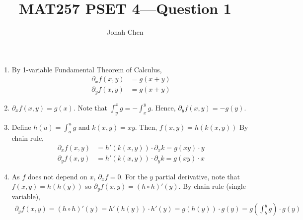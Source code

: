 \documentclass{exam}
\title{MAT257 PSET 4---Question 1}
\author{Jonah Chen}
\numberwithin{equation}{section}
\begin{document}
    \sffamily
    \maketitle
    \begin{enumerate}[label=(\alph*)]
        \item By 1-variable Fundamental Theorem of Calculus,
        \begin{align*}
            \partial_x f(x,y)&=g(x+y)\\
            \partial_y f(x,y)&=g(x+y)
        \end{align*}
        \item $\partial_xf(x,y)=g(x)$. Note that $\int_y^xg=-\int_x^yg$. Hence, $\partial_yf(x,y)=-g(y)$.
        \item Define $h(u)=\int_a^ug$ and $k(x,y)=xy$. Then, $f(x,y)=h(k(x,y))$ By chain rule, 
        \begin{align*}
            \partial_xf(x,y)&=h'(k(x,y))\cdot\partial_xk=g(xy)\cdot y\\
            \partial_yf(x,y)&=h'(k(x,y))\cdot\partial_yk=g(xy)\cdot x
        \end{align*}
        \item As $f$ does not depend on $x$, $\partial_xf=0$. For the $y$ partial derivative, note that $f(x,y)=h(h(y))$ so $\partial_yf(x,y)=(h\circ h)'(y)$. By chain rule (single variable), \begin{align*}
            \partial_yf(x,y)=(h\circ h)'(y)=h'(h(y))\cdot h'(y)=g(h(y))\cdot g(y)=g\left(\int_{b}^yg\right)\cdot g(y)
        \end{align*}
    \end{enumerate}
\end{document}
